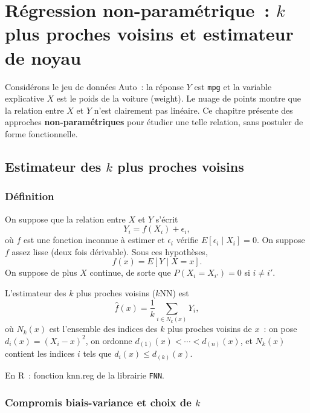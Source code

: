 \documentclass[11pt,letterpaper]{article}
\begin{document}
\newpage
\section{Régression non-paramétrique~: $k$ plus proches voisins et estimateur de noyau}
\label{sec:knn}

Considérons le jeu de données \textsf{Auto}~: la réponse $Y$ est \texttt{mpg} et la variable explicative $X$ est le poids de la voiture (\textsf{weight}). Le nuage de points montre que la relation entre $X$ et $Y$ n'est clairement pas linéaire. Ce chapitre présente des approches \textbf{non-paramétriques} pour étudier une telle relation, sans postuler de forme fonctionnelle.

\subsection{Estimateur des $k$ plus proches voisins}

\subsubsection{Définition}

On suppose que la relation entre $X$ et $Y$ s'écrit
$$Y_i = f(X_i) + \epsilon_i,$$
où $f$ est une fonction inconnue à estimer et $\epsilon_i$ vérifie $E[\epsilon_i\mid X_i] = 0$. On suppose $f$ assez lisse (deux fois dérivable). Sous ces hypothèses,
$$f(x) = E[Y\mid X = x].$$
On suppose de plus $X$ continue, de sorte que $P(X_i = X_{i'}) = 0$ si $i\neq i'$.

L'estimateur des $k$ plus proches voisins ($k$NN) est
$$\hat f(x) = \frac{1}{k}\sum_{i\in N_k(x)} Y_i,$$
où $N_k(x)$ est l'ensemble des indices des $k$ plus proches voisins de $x$~: on pose $d_i(x) = (X_i - x)^2$, on ordonne $d_{(1)}(x) < \cdots < d_{(n)}(x)$, et $N_k(x)$ contient les indices $i$ tels que $d_i(x) \leq d_{(k)}(x)$.

En \textrm{R}~: fonction \textsf{knn.reg} de la librairie \texttt{FNN}.

\subsubsection{Compromis biais-variance et choix de $k$}
\end{document}
